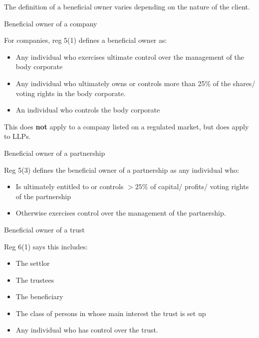 \documentclass[
]{article}
\providecommand{\tightlist}{%
  \setlength{\itemsep}{0pt}\setlength{\parskip}{0pt}}
\newenvironment{env-86a00e9b-0e00-4fe8-86cd-090a54119c0f}
{
    \savenotes\tcolorbox[blanker,breakable,left=5pt,borderline west={2pt}{-4pt}{gold}]
}
{
    \endtcolorbox\spewnotes
}
\begin{document}
The definition of a beneficial owner varies depending on the nature of
the client.

\begin{env-86a00e9b-0e00-4fe8-86cd-090a54119c0f}

Beneficial owner of a company

For companies, reg 5(1) defines a beneficial owner as:

\begin{itemize}
\tightlist
\item
  Any individual who exercises ultimate control over the management of
  the body corporate
\item
  Any individual who ultimately owns or controls more than 25\% of the
  shares/ voting rights in the body corporate.
\item
  An individual who controls the body corporate
\end{itemize}

\end{env-86a00e9b-0e00-4fe8-86cd-090a54119c0f}

This does \textbf{not} apply to a company listed on a regulated market,
but does apply to LLPs.

\begin{env-86a00e9b-0e00-4fe8-86cd-090a54119c0f}

Beneficial owner of a partnership

Reg 5(3) defines the beneficial owner of a partnership as any individual
who:

\begin{itemize}
\tightlist
\item
  Is ultimately entitled to or controls {\(> 25\%\)} of capital/
  profits/ voting rights of the partnership
\item
  Otherwise exercises control over the management of the partnership.
\end{itemize}

\end{env-86a00e9b-0e00-4fe8-86cd-090a54119c0f}

\begin{env-86a00e9b-0e00-4fe8-86cd-090a54119c0f}

Beneficial owner of a trust

Reg 6(1) says this includes:

\begin{itemize}
\tightlist
\item
  The settlor
\item
  The trustees
\item
  The beneficiary
\item
  The class of persons in whose main interest the trust is set up
\item
  Any individual who has control over the trust.
\end{itemize}

\end{env-86a00e9b-0e00-4fe8-86cd-090a54119c0f}
\end{document}
